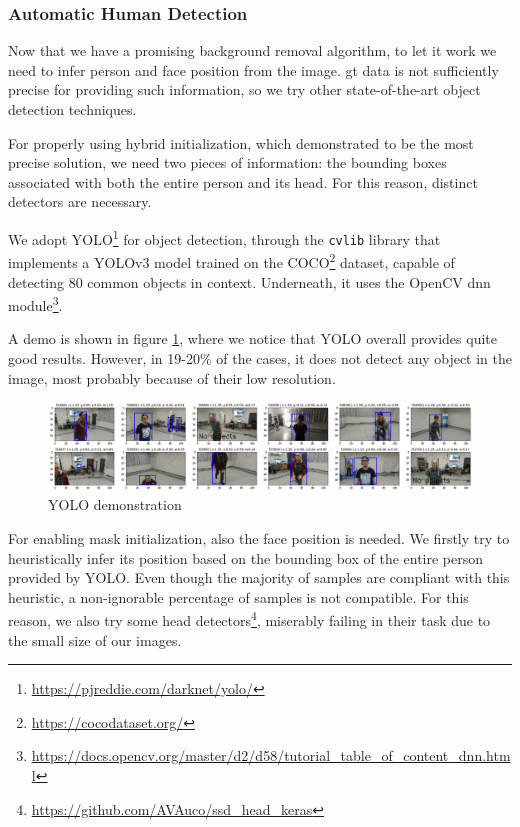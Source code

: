 \subsubsection{Automatic Human Detection}
\label{subsec:masking-yolo}

Now that we have a promising background removal algorithm, to let it work we need to infer person and face position from the image. \gls{gt} data is not sufficiently precise for providing such information, so we try other state-of-the-art object detection techniques.

For properly using hybrid initialization, which demonstrated to be the most precise solution, we need two pieces of information: the bounding boxes associated with both the entire person and its head. For this reason, distinct detectors are necessary.

We adopt YOLO\footnote{\url{https://pjreddie.com/darknet/yolo/}} for object detection, through the \texttt{cvlib} library that implements a YOLOv3 model trained on the COCO\footnote{\url{https://cocodataset.org/}} dataset, capable of detecting 80 common objects in context. Underneath, it uses the OpenCV dnn module\footnote{\url{https://docs.opencv.org/master/d2/d58/tutorial_table_of_content_dnn.html}}.

A demo is shown in figure \ref{fig:yolo}, where we notice that YOLO overall provides quite good results. However, in 19-20\% of the cases, it does not detect any object in the image, most probably because of their low resolution.

\begin{figure}[!h]
	\centering
	\includegraphics[width=1\textwidth]{"contents/images/04-3yolo"}
	\caption[YOLO demonstration]{YOLO demonstration}
	\label{fig:yolo}
\end{figure}

\medskip

For enabling mask initialization, also the face position is needed. We firstly try to heuristically infer its position based on the bounding box of the entire person provided by YOLO. Even though the majority of samples are compliant with this heuristic, a non-ignorable percentage of samples is not compatible. For this reason, we also try some head detectors\footnote{\url{https://github.com/AVAuco/ssd_head_keras}}, miserably failing in their task due to the small size of our images.

